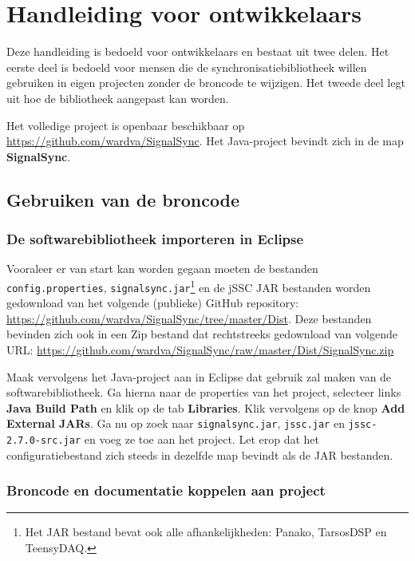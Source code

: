 \chapter{Handleiding voor ontwikkelaars}
\label{appendix-e}

Deze handleiding is bedoeld voor ontwikkelaars en bestaat uit twee delen. Het eerste deel is bedoeld voor mensen die de synchronisatiebibliotheek willen gebruiken in eigen projecten zonder de broncode te wijzigen. Het tweede deel legt uit hoe de bibliotheek aangepast kan worden.

Het volledige project is openbaar beschikbaar op \url{https://github.com/wardva/SignalSync}. Het Java-project bevindt zich in de map \textbf{SignalSync}.

\section{Gebruiken van de broncode}

\subsection*{De softwarebibliotheek importeren in Eclipse}

Vooraleer er van start kan worden gegaan moeten de bestanden \texttt{config.properties}, \texttt{signalsync.jar}\footnote{Het JAR bestand bevat ook alle afhankelijkheden: Panako\cite{six2014panako}, TarsosDSP\cite{six2014tarsosdsp} en TeensyDAQ.} en de jSSC JAR bestanden worden gedownload van het volgende (publieke) GitHub repository: \url{https://github.com/wardva/SignalSync/tree/master/Dist}. Deze bestanden bevinden zich ook in een Zip bestand dat rechtstreeks gedownload van volgende URL: \url{https://github.com/wardva/SignalSync/raw/master/Dist/SignalSync.zip}

Maak vervolgens het Java-project aan in Eclipse dat gebruik zal maken van de softwarebibliotheek. Ga hierna naar de properties van het project, selecteer links \textbf{Java Build Path} en klik op de tab \textbf{Libraries}. Klik vervolgens op de knop \textbf{Add External JARs}. Ga nu op zoek naar \texttt{signalsync.jar}, \texttt{jssc.jar} en \texttt{jssc-2.7.0-src.jar} en voeg ze toe aan het project. Let erop dat het configuratiebestand zich steeds in dezelfde map bevindt als de JAR bestanden.

\subsection*{Broncode en documentatie koppelen aan project}

